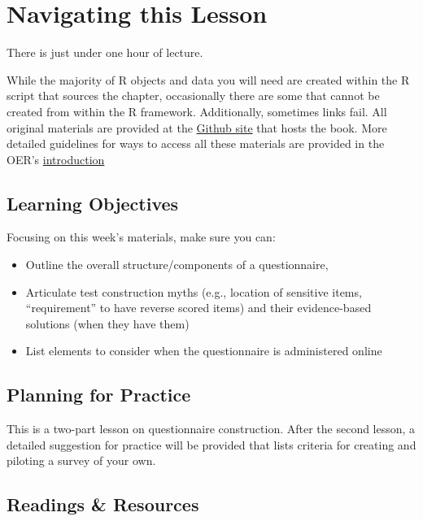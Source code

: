 \documentclass[
  english,
]{book}
\providecommand{\tightlist}{%
  \setlength{\itemsep}{0pt}\setlength{\parskip}{0pt}}
\begin{document}
\hypertarget{navigating-this-lesson}{%
\section{Navigating this Lesson}\label{navigating-this-lesson}}

There is just under one hour of lecture.

While the majority of R objects and data you will need are created within the R script that sources the chapter, occasionally there are some that cannot be created from within the R framework. Additionally, sometimes links fail. All original materials are provided at the \href{https://github.com/lhbikos/ReC_Psychometrics}{Github site} that hosts the book. More detailed guidelines for ways to access all these materials are provided in the OER's \protect\hyperlink{ReCintro}{introduction}

\hypertarget{learning-objectives}{%
\subsection{Learning Objectives}\label{learning-objectives}}

Focusing on this week's materials, make sure you can:

\begin{itemize}
\tightlist
\item
  Outline the overall structure/components of a questionnaire,
\item
  Articulate test construction myths (e.g., location of sensitive items, ``requirement'' to have reverse scored items) and their evidence-based solutions (when they have them)
\item
  List elements to consider when the questionnaire is administered online
\end{itemize}

\hypertarget{planning-for-practice}{%
\subsection{Planning for Practice}\label{planning-for-practice}}

This is a two-part lesson on questionnaire construction. After the second lesson, a detailed suggestion for practice will be provided that lists criteria for creating and piloting a survey of your own.

\hypertarget{readings-resources}{%
\subsection{Readings \& Resources}\label{readings-resources}}
\end{document}
